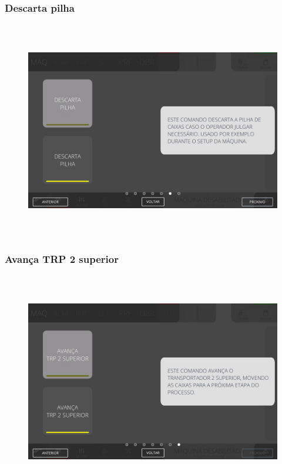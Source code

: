 \newpage
\thispagestyle{fancy}
\vspace*{\fill}
\subsubsection{\small{Descarta pilha}}
\begin{figure}[h]
  \centering
  \includegraphics[width=576px,height=360px]{src/imagesFlexo/08-count/commands/e-6.png}
\end{figure}
\vspace*{\fill}

\newpage
\thispagestyle{fancy}
\vspace*{\fill}
\subsubsection{\small{Avança TRP 2 superior}}
\begin{figure}[h]
  \centering
  \includegraphics[width=576px,height=360px]{src/imagesFlexo/08-count/commands/e-7.png}
\end{figure}
\vspace*{\fill}


